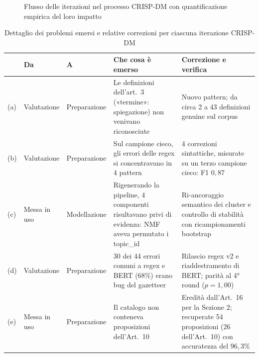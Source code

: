 \documentclass[12pt,a4paper,oneside]{report}
\begin{document}
\begin{figure}[htbp]
    \caption{Flusso delle iterazioni nel processo CRISP-DM con quantificazione empirica del loro impatto}
    \label{fig:crisp_dm_flow}
\end{figure}

\begin{table}[htbp]
    \centering
    \renewcommand{\arraystretch}{1.5}
    \small
    \begin{tabular}{@{}p{0.5cm} p{1.8cm} p{1.8cm} p{4cm} p{4.2cm}@{}}
        \toprule
         & \textbf{Da} & \textbf{A} & \textbf{Che cosa è emerso} & \textbf{Correzione e verifica} \\
        \midrule
        (a) & Valutazione & Preparazione & Le definizioni dell'art.~3 («termine»: spiegazione) non venivano riconosciute & Nuovo pattern; da circa 2 a 43 definizioni genuine sul corpus \\
        \midrule
        (b) & Valutazione & Preparazione & Sul campione cieco, gli errori delle regex si concentravano in 4 pattern & 4 correzioni sintattiche, misurate su un terzo campione cieco: F1 $0{,}87$ \\
        \midrule
        (c) & Messa in uso & Modellazione & Rigenerando la pipeline, 4 componenti risultavano privi di evidenza: NMF aveva permutato i topic\_id & Ri-ancoraggio semantico dei cluster e controllo di stabilità con ricampionamenti bootstrap \\
        \midrule
        (d) & Valutazione & Preparazione & 30 dei 44 errori comuni a regex e BERT ($68\%$) erano bug del gazetteer & Rilascio regex v2 e riaddestramento di BERT; parità al 4° round ($p = 1{,}00$) \\
        \midrule
        (e) & Messa in uso & Preparazione & Il catalogo non conteneva proposizioni dell'Art.~10 & Eredità dall'Art.~16 per la Sezione 2; recuperate 54 proposizioni (26 dell'Art.~10) con accuratezza del $96{,}3\%$ \\
        \bottomrule
    \end{tabular}
    \caption{Dettaglio dei problemi emersi e relative correzioni per ciascuna iterazione CRISP-DM}
    \label{tab:dettaglio_iterazioni}
\end{table}
\end{document}
